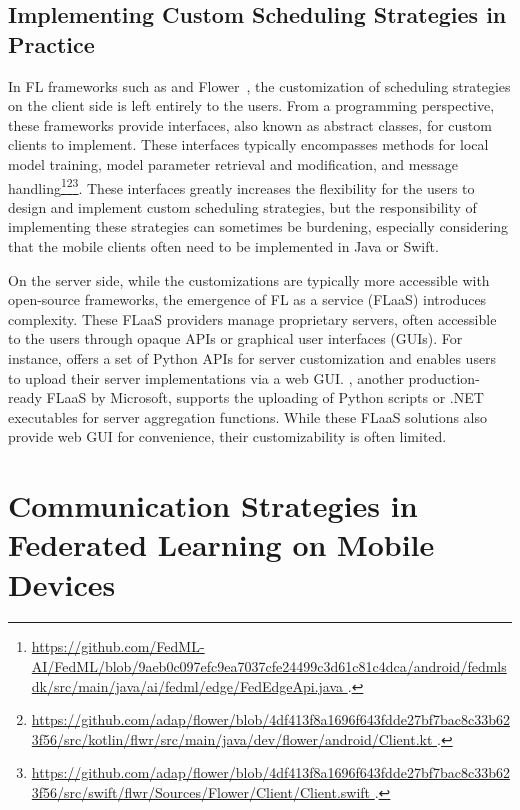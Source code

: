 \documentclass[conference]{IEEEtran}
\begin{document}
\subsection{Implementing Custom Scheduling Strategies in Practice}

\newcommand{\Flower}{Flower~\cite{beutel2020flower}}

In FL frameworks such as \FedML{} and \Flower{},
the customization of scheduling strategies on the client side is
left entirely to the users.
From a programming perspective,
these frameworks provide interfaces,
also known as abstract classes,
for custom clients to implement.
These interfaces typically encompasses methods for
local model training,
model parameter retrieval and modification,
and message handling\footnote{\url{
    https://github.com/FedML-AI/FedML/blob/9aeb0c097efc9ea7037cfe24499c3d61c81c4dca/android/fedmlsdk/src/main/java/ai/fedml/edge/FedEdgeApi.java
}.}\footnote{\url{
    https://github.com/adap/flower/blob/4df413f8a1696f643fdde27bf7bac8c33b623f56/src/kotlin/flwr/src/main/java/dev/flower/android/Client.kt
}.}\footnote{\url{
    https://github.com/adap/flower/blob/4df413f8a1696f643fdde27bf7bac8c33b623f56/src/swift/flwr/Sources/Flower/Client/Client.swift
}.}.
These interfaces greatly increases the flexibility for the users to
design and implement custom scheduling strategies,
but the responsibility of implementing these strategies can
sometimes be burdening,
especially considering that the mobile clients often need to
be implemented in Java or Swift.

On the server side,
while the customizations are typically more accessible with
open-source frameworks,
the emergence of FL as a service (FLaaS)
introduces complexity.
These FLaaS providers manage proprietary servers,
often accessible to the users through opaque APIs or
graphical user interfaces (GUIs).
For instance, \FedML{}
offers a set of Python APIs for server customization
and enables users to upload their server implementations via a web GUI.
\Florida{}, another production-ready FLaaS by Microsoft,
supports the uploading of Python scripts or .NET executables for
server aggregation functions.
While these FLaaS solutions also provide web GUI for convenience,
their customizability is often limited.

\section{Communication Strategies in Federated Learning on Mobile Devices}
\end{document}

